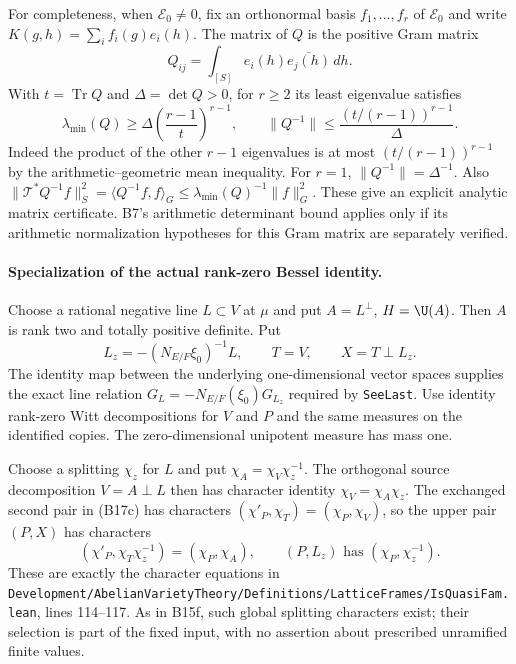 For completeness, when $\mathcal E_0\ne0$, fix an orthonormal basis $f_1,\ldots,f_r$ of
$\mathcal E_0$ and write $K(g,h)=\sum_i f_i(g)e_i(h)$. The matrix
of $Q$ is the positive Gram matrix
\[
 Q_{ij}=\int_{[S]}e_i(h)\overline{e_j(h)}\,dh .
\]
With $t=\operatorname{Tr}Q$ and $\Delta=\det Q>0$, for $r\geq2$
its least eigenvalue satisfies
\[
 \lambda_{\min}(Q)\geq
       \Delta\left(\frac{r-1}{t}\right)^{r-1},
 \qquad
 \|Q^{-1}\|\leq
       \frac{(t/(r-1))^{r-1}}{\Delta}.
 \tag{B17f}
\]
Indeed the product of the other $r-1$ eigenvalues is at most
$(t/(r-1))^{r-1}$ by the arithmetic--geometric mean inequality.
For $r=1$, $\|Q^{-1}\|=\Delta^{-1}$.
Also
$\|\mathcal T^*Q^{-1}f\|_S^2
 =\langle Q^{-1}f,f\rangle_G
 \leq\lambda_{\min}(Q)^{-1}\|f\|_G^2$.
These give an explicit analytic matrix certificate. B7's
arithmetic determinant bound applies only if its arithmetic
normalization hypotheses for this Gram matrix are separately
verified.

\paragraph{Specialization of the actual rank-zero Bessel identity.}
Choose a rational negative line $L\subset V$ at $\mu$ and put
$A=L^\perp$, $H=\U(A)$. Then $A$ is rank two and totally
positive definite. Put
\[
 L_z=-(N_{E/F}\xi_0)^{-1}L,\qquad
 T=V,\qquad X=T\perp L_z .
\]
The identity map between the underlying one-dimensional vector
spaces supplies the exact line relation
$G_L=-N_{E/F}(\xi_0)G_{L_z}$ required by
\texttt{SeeLast}. Use identity rank-zero Witt decompositions
for $V$ and $P$ and the same measures on the identified copies.
The zero-dimensional unipotent measure has mass one.

Choose a splitting $\chi_z$ for $L$ and put
$\chi_A=\chi_V\chi_z^{-1}$. The orthogonal source decomposition
$V=A\perp L$ then has character identity
$\chi_V=\chi_A\chi_z$. The exchanged second pair in (B17c)
has characters $(\chi'_P,\chi_T)=(\chi_P,\chi_V)$, so the
upper pair $(P,X)$ has characters
\[
 (\chi'_P,\chi_T\chi_z^{-1})=(\chi_P,\chi_A),
 \qquad (P,L_z)\text{ has }(\chi_P,\chi_z^{-1}).
\]
These are exactly the character equations in
\texttt{Development/\allowbreak{}AbelianVarietyTheory/\allowbreak{}Definitions/\allowbreak{}LatticeFrames/\allowbreak{}IsQuasiFam.lean},
lines 114--117. As in B15f,
such global splitting characters exist; their selection is
part of the fixed input, with no assertion about prescribed
unramified finite values.

